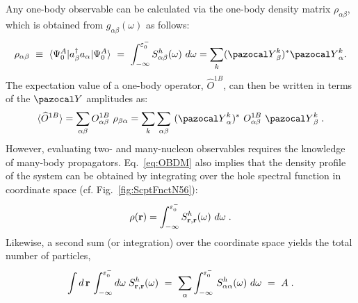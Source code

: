Any one-body observable can be calculated via the one-body density matrix $\rho_{\alpha\beta}$, which is obtained from $g_{\alpha\beta}(\omega)$ as follows:
\begin{equation}
 \rho_{\alpha \beta} ~\equiv ~ \langle\Psi_0^A\vert a^{\dag}_{\beta}a_{\alpha} \vert\Psi_0^A\rangle
  ~=~  \int_{-\infty}^{\varepsilon^-_0}S^h_{\alpha\beta}(\omega)~d\omega=\sum_k ({\pazocal Y}^k_{\beta})^*{\pazocal Y}^k_{\alpha} .
 \label{eq:OBDM}
\end{equation}
The expectation value of a one-body operator, ${\widehat O}^{1B}$, can then be written in terms of the ${\pazocal Y}$ amplitudes as:
\begin{equation}
\label{eq:den_one}
\langle {\widehat O}^{1B}\rangle  =\sum_{\alpha\beta}  O^{1B}_{\alpha \beta}\,\,\rho_{\beta\alpha}=\sum_k \sum_{\alpha\beta}~ ({\pazocal Y}^k_{\alpha})^*~ O^{1B}_{\alpha\beta} ~  {\pazocal Y}^k_{\beta} \; .
\end{equation}
However, evaluating two- and many-nucleon observables requires the knowledge of many-body propagators. 
%
Eq.~\eqref{eq:OBDM} also implies that the density profile of the system can be obtained by integrating over the hole  spectral function in coordinate space (cf. Fig.~\ref{fig:ScptFnctN56}):
\begin{equation}
  \label{eq:rho_r}
   \rho({\bf r})  =  \int_{-\infty}^{\varepsilon^-_0}S^h_{{\bf r},{\bf r}}(\omega)~d\omega \; .
\end{equation}
Likewise, a second sum (or integration) over the coordinate space yields the total number of particles,
\begin{equation}
  \int d\,{\bf r} \,  \int_{-\infty}^{\varepsilon^-_0} d\omega \; S^h_{{\bf r},{\bf r}}(\omega) ~=~
   \sum_\alpha \int_{-\infty}^{\varepsilon^-_0} \, S^h_{\alpha\alpha}(\omega)~d\omega ~=~ A \; .
\end{equation}

